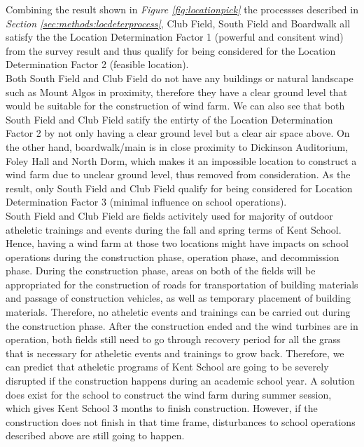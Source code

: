 \documentclass[review]{elsarticle}
\begin{document}
Combining the result shown in \textit{Figure \ref{fig:locationpick}} the processses described in \textit{Section \ref{sec:methods:locdeterprocess}}, Club Field, South Field and 
Boardwalk all satisfy the the Location Determination Factor 1 (powerful and consitent wind) from the survey result and thus qualify for being considered for the Location Determination Factor 2 (feasible location).  %
\\\indent Both South Field and Club Field do not have any buildings or natural landscape such as Mount Algos in proximity, therefore they have a clear ground level that would 
be suitable for the construction of wind farm. We can also see that both South Field and Club Field satify the entirty of the Location Determination Factor 2 by not only having 
a clear ground level but a clear air space above. On the other hand, boardwalk/main is in close proximity to Dickinson Auditorium, Foley Hall and North Dorm, which makes it an 
impossible location to construct a wind farm due to unclear ground level, thus removed from consideration. As the result, only South Field and Club Field qualify for being 
considered for Location Determination Factor 3 (minimal influence on school operations).
\\\indent South Field and Club Field are fields activitely used for majority of outdoor atheletic trainings and events during the fall and spring terms of Kent School. Hence, 
having a wind farm at those two locations might have impacts on school operations during the construction phase, operation phase, and decommission phase. During the construction 
phase, areas on both of the fields will be appropriated for the construction of roads for transportation of building materials and passage of construction vehicles, as well as
temporary placement of building materials. Therefore, no atheletic events and trainings can be carried out during the construction phase. After the construction ended and the wind 
turbines are in operation, both fields still need to go through recovery period for all the grass that is necessary for atheletic events and trainings to grow back. Therefore, we 
can predict that atheletic programs of Kent School are going to be severely disrupted if the construction happens during an academic school year. A solution does exist for the school 
to construct the wind farm during summer session, which gives Kent School 3 months to finish construction. However, if the construction does not finish in that time frame, disturbances 
to school operations described above are still going to happen. %
\end{document}
